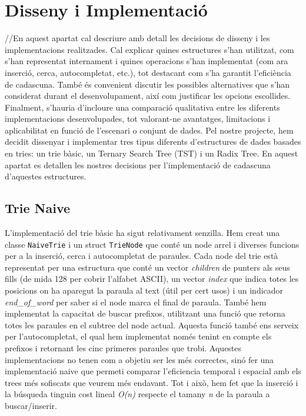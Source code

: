 \section{Disseny i Implementació}
//En aquest apartat cal descriure amb detall les decisions de disseny i les implementacions realitzades. Cal explicar quines estructures s’han utilitzat, com s’han representat internament i quines operacions s’han implementat (com ara inserció, cerca, autocompletat, etc.), tot destacant com s’ha garantit l’eficiència de cadascuna. També és convenient discutir les possibles alternatives que s’han considerat durant el desenvolupament, així com justificar les opcions escollides. Finalment, s’hauria d’incloure una comparació qualitativa entre les diferents implementacions desenvolupades, tot valorant-ne avantatges, limitacions i aplicabilitat en funció de l’escenari o conjunt de dades.
Pel nostre projecte, hem decidit dissenyar i implementar tres tipus diferents d'estructures de dades basades en tries: un trie bàsic, un Ternary Search Tree (TST) i un Radix Tree. En aquest apartat es detallen les nostres decisions per l'implementació de cadascuna d'aquestes estructures.
\subsection{Trie Naive}
L'implementació del trie bàsic ha sigut relativament senzilla. Hem creat una classe \texttt{NaiveTrie} i un struct \texttt{TrieNode} que conté un node arrel i diverses funcions per a la inserció, cerca i autocompletat de paraules. 
Cada node del trie està representat per una estructura que conté un vector \textit{children} de punters als seus fills (de mida 128 per cobrir l'alfabet ASCII), un vector \textit{index} que indica totes les posicions on ha aparegut la paraula al text (útil per cert usos) i un indicador \textit{end_of_word} per saber si el node marca el final de paraula.
També hem implementat la capacitat de buscar prefixos, utilitzant una funció que retorna totes les paraules en el subtree del node actual. Aquesta funció també ens serveix per l'autocompletat, el qual hem implementat només tenint en compte els prefixos i retornant les cinc primeres paraules que trobi.
Aquestes implementacions no tenen com a objetiu ser les més correctes, sinó fer una implementació naive que permeti comparar l'eficiencia temporal i espacial amb els trees més sofiscats que veurem més endavant. Tot i això, hem fet que la inserció i la búsqueda tinguin cost lineal \textit{O(n)} respecte el tamany \textit{n} de la paraula a buscar/inserir.

